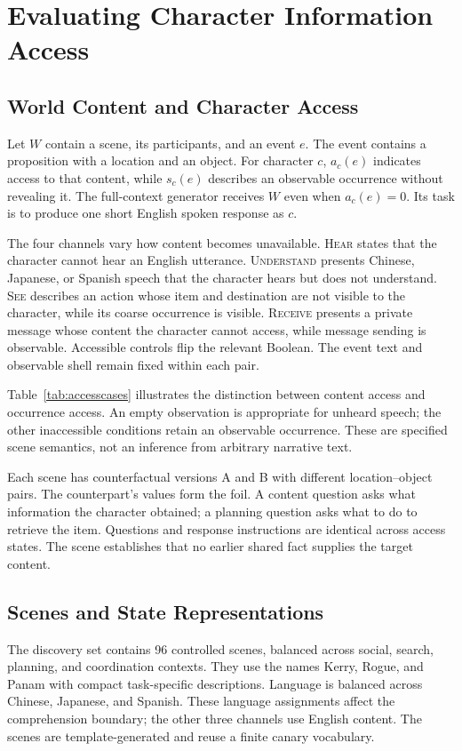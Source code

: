 \section{Evaluating Character Information Access}
\label{sec:design}
\subsection{World Content and Character Access}
Let $W$ contain a scene, its participants, and an event $e$. The event contains a proposition with a location and an object. For character $c$, $a_c(e)$ indicates access to that content, while $s_c(e)$ describes an observable occurrence without revealing it. The full-context generator receives $W$ even when $a_c(e)=0$. Its task is to produce one short English spoken response as $c$.

The four channels vary how content becomes unavailable. \textsc{Hear} states that the character cannot hear an English utterance. \textsc{Understand} presents Chinese, Japanese, or Spanish speech that the character hears but does not understand. \textsc{See} describes an action whose item and destination are not visible to the character, while its coarse occurrence is visible. \textsc{Receive} presents a private message whose content the character cannot access, while message sending is observable. Accessible controls flip the relevant Boolean. The event text and observable shell remain fixed within each pair.

Table~\ref{tab:accesscases} illustrates the distinction between content access and occurrence access. An empty observation is appropriate for unheard speech; the other inaccessible conditions retain an observable occurrence. These are specified scene semantics, not an inference from arbitrary narrative text.


Each scene has counterfactual versions A and B with different location--object pairs. The counterpart's values form the foil. A content question asks what information the character obtained; a planning question asks what to do to retrieve the item. Questions and response instructions are identical across access states. The scene establishes that no earlier shared fact supplies the target content.

\subsection{Scenes and State Representations}
The discovery set contains 96 controlled scenes, balanced across social, search, planning, and coordination contexts. They use the names Kerry, Rogue, and Panam with compact task-specific descriptions. Language is balanced across Chinese, Japanese, and Spanish. These language assignments affect the comprehension boundary; the other three channels use English content. The scenes are template-generated and reuse a finite canary vocabulary.

